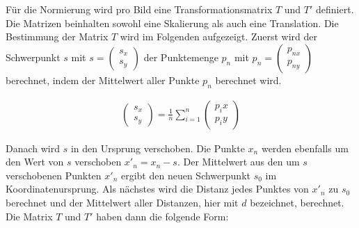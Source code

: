 % 
%
%

Für die Normierung wird pro Bild eine Transformationsmatrix $T$ und $T'$ definiert. Die Matrizen beinhalten sowohl eine Skalierung als auch eine Translation. Die Bestimmung der Matrix $T$ wird im Folgenden aufgezeigt. Zuerst wird der Schwerpunkt $s$ mit $s=\begin{pmatrix}
s_x\\
s_y
\end{pmatrix}$ der Punktemenge $p_n$ mit $p_n = \begin{pmatrix}
p_{nx}\\
p_{ny}
\end{pmatrix}$ berechnet, indem der Mittelwert aller Punkte $p_n$ berechnet wird.

\begin{gather}
	\begin{pmatrix}
		s_x\\
		s_y
	\end{pmatrix} = \frac{1}{n} \sum_{i = 1}^{n} \begin{pmatrix}
	p_ix\\
	p_iy
\end{pmatrix}
\end{gather}

Danach wird $s$ in den Ursprung verschoben. Die Punkte $x_n$ werden ebenfalls um den Wert von $s$ verschoben $x'_n = x_n - s$. Der Mittelwert aus den um $s$ verschobenen Punkten $x'_n$ ergibt den neuen Schwerpunkt $s_0$ im Koordinatenursprung. Als nächstes wird die Distanz jedes Punktes von $x'_n$ zu $s_0$ berechnet und der Mittelwert aller Distanzen, hier mit $d$ bezeichnet, berechnet. Die Matrix $T$ und $T'$ haben dann die folgende Form:

